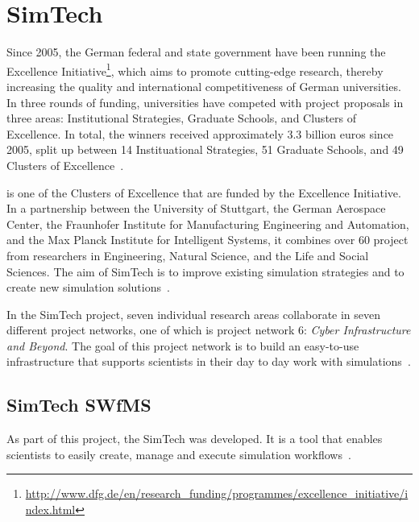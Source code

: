 \section{SimTech}
\label{fundamentals:simtech}

Since 2005, the German federal and state government have been running the Excellence Initiative\footnote{\url{http://www.dfg.de/en/research_funding/programmes/excellence_initiative/index.html}}, which aims to promote cutting-edge research, thereby increasing the quality and international competitiveness of German universities.
In three rounds of funding, universities have competed with project proposals in three areas: Institutional Strategies, Graduate Schools, and Clusters of Excellence.
In total, the winners received approximately 3.3 billion euros since 2005, split up between 14 Instituational Strategies, 51 Graduate Schools, and 49 Clusters of Excellence~\autocite[pp.~16-18]{excellence:glance}.

 is one of the Clusters of Excellence that are funded by the Excellence Initiative.
In a partnership between the University of Stuttgart, the German Aerospace Center, the Fraunhofer Institute for Manufacturing Engineering and Automation, and the Max Planck Institute for Intelligent Systems, it combines over 60 project from researchers in Engineering, Natural Science, and the Life and Social Sciences.
The aim of SimTech is to improve existing simulation strategies and to create new simulation solutions~\autocite[pp.~109]{excellence:glance}.

In the SimTech project, seven individual research areas collaborate in seven different project networks, one of which is project network 6: \textit{Cyber Infrastructure and Beyond}.
The goal of this project network is to build an easy-to-use infrastructure that supports scientists in their day to day work with simulations~\autocite{simtech:projectnetwork6}.

\subsection{SimTech SWfMS}

As part of this project, the SimTech  was developed.
It is a tool that enables scientists to easily create, manage and execute simulation workflows~\autocite{workflow:simulation:flexibility}.

